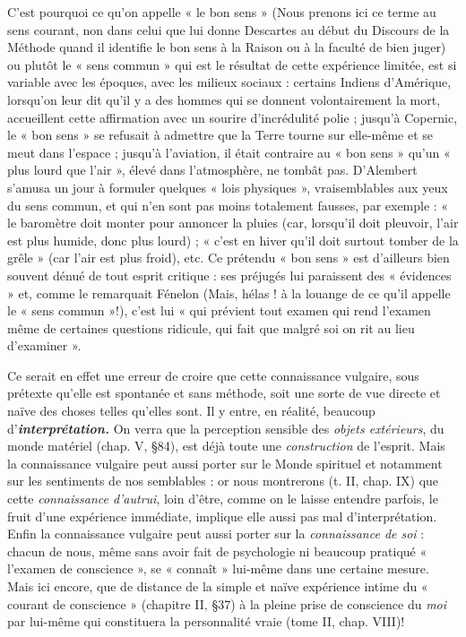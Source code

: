 \vspace{0.24cm}
{\footnotesize 
C'est pourquoi ce qu’on appelle « le bon sens »
{\scriptsize (Nous prenons ici ce terme au sens courant, non dans celui que lui donne Descartes
au début du Discours de la Méthode quand il identifie le bon sens à la Raison ou à la
faculté de bien juger)}
 ou plutôt le « sens
commun » qui est le résultat de cette expérience limitée, est si variable avec
les époques, avec les milieux sociaux : certains Indiens d'Amérique, lorsqu’on
leur dit qu'il y a des hommes qui se donnent volontairement la mort,
accueillent cette affirmation avec un sourire d’incrédulité polie ; jusqu’à
Copernic, le « bon sens » se refusait à admettre que la Terre tourne sur elle-même
et se meut dans l’espace ; jusqu’à l'aviation, il était contraire au
« bon sens » qu’un « plus lourd que l'air », élevé dans l'atmosphère, ne
tombât pas. D’Alembert s’amusa un jour à formuler quelques « lois physiques »,
vraisemblables aux yeux du sens commun, et qui n’en sont pas
moins totalement fausses, par exemple : « le baromètre doit monter pour
annoncer la pluies (car, lorsqu'il doit pleuvoir, l’air est plus humide, donc
plus lourd) ; « c’est en hiver qu’il doit surtout tomber de la grêle » (car l’air
est plus froid), etc. Ce prétendu « bon sens » est d’ailleurs bien souvent
dénué de tout esprit critique : ses préjugés lui paraissent des « évidences » et,
comme le remarquait Fénelon
{\scriptsize (Mais, hélas ! à la louange de ce qu'il appelle le « sens commun »!)},
c’est lui « qui prévient tout examen
qui rend l’examen même de certaines questions ridicule, qui fait que malgré
soi on rit au lieu d'examiner ».}
\vspace{0.31cm}

Ce serait en effet une erreur de croire que cette connaissance vulgaire,
sous prétexte qu’elle est spontanée et sans méthode, soit une
sorte de vue directe et naïve des choses telles qu’elles sont. Il y entre, en
réalité, beaucoup d'\textbf{\textit {interprétation.}} On verra que la perception sensible
des {\it objets extérieurs}, du monde matériel (chap. V, \S 84), est
déjà toute une {\it construction} de l’esprit. Mais la connaissance vulgaire
peut aussi porter sur le Monde spirituel et notamment sur les sentiments
de nos semblables : or nous montrerons (t. II, chap. IX) que
cette {\it connaissance d’autrui}, loin d’être, comme on le laisse entendre
parfois, le fruit d’une expérience immédiate, implique elle aussi pas
mal d'interprétation. Enfin la connaissance vulgaire peut aussi porter
sur la {\it connaissance de soi} : chacun de nous, même sans avoir fait de
psychologie ni beaucoup pratiqué « l'examen de conscience », se
« connaît » lui-même dans une certaine mesure. Mais ici encore, que
de distance de la simple et naïve expérience intime du « courant de
conscience » (chapitre II, \S 37) à la pleine prise de conscience du
{\it moi} par lui-même qui constituera la personnalité vraie (tome II,
chap. VIII)!

